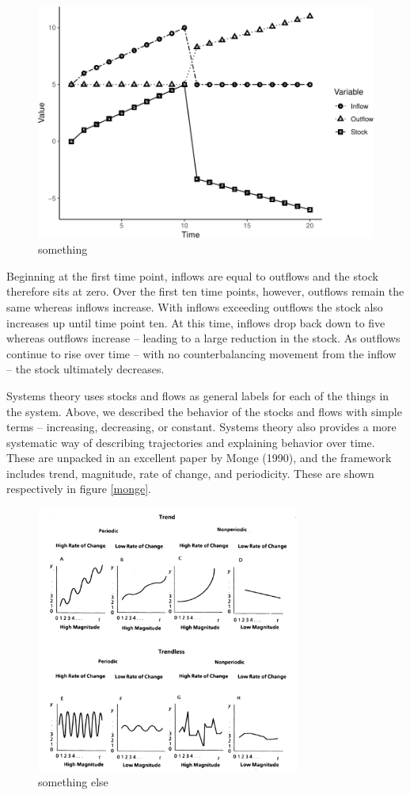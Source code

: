 \documentclass[english,,man]{apa6}
\theoremstyle{definition}
\theoremstyle{definition}
\theoremstyle{definition}
\theoremstyle{remark}
\begin{document}
\begin{figure}
\centering
\includegraphics{figs/unnamed-chunk-4-1.pdf}
\caption{\label{fig:unnamed-chunk-4}something\label{stocks}}
\end{figure}

\noindent Beginning at the first time point, inflows are equal to
outflows and the stock therefore sits at zero. Over the first ten time
points, however, outflows remain the same whereas inflows increase. With
inflows exceeding outflows the stock also increases up until time point
ten. At this time, inflows drop back down to five whereas outflows
increase -- leading to a large reduction in the stock. As outflows
continue to rise over time -- with no counterbalancing movement from the
inflow -- the stock ultimately decreases.

Systems theory uses stocks and flows as general labels for each of the
things in the system. Above, we described the behavior of the stocks and
flows with simple terms -- increasing, decreasing, or constant. Systems
theory also provides a more systematic way of describing trajectories
and explaining behavior over time. These are unpacked in an excellent
paper by Monge (1990), and the framework includes trend, magnitude, rate
of change, and periodicity. These are shown respectively in figure
\ref{monge}.

\begin{figure}
\includegraphics[width=3.42in]{figs/fig_monge1} \caption{something else\label{monge}}\label{fig:unnamed-chunk-5}
\end{figure}
\end{document}
